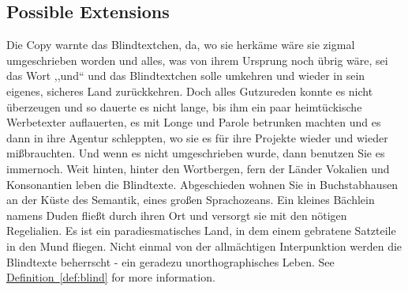 \documentclass[12pt,a4paper,twoside]{scrartcl}
\numberwithin{equation}{section}
\newcommand{\refdef}[1]{\hyperref[#1]{Definition~\ref*{#1}}}
\begin{document}
\subsection{Possible Extensions}

Die Copy warnte das Blindtextchen, da, wo sie herkäme wäre sie zigmal umgeschrieben worden und alles, was von ihrem Ursprung noch übrig wäre, sei das Wort ,,und`` und das Blindtextchen solle umkehren und wieder in sein eigenes, sicheres Land zurückkehren. Doch alles Gutzureden konnte es nicht überzeugen und so dauerte es nicht lange, bis ihm ein paar heimtückische Werbetexter auflauerten, es mit Longe und Parole betrunken machten und es dann in ihre Agentur schleppten, wo sie es für ihre Projekte wieder und wieder mißbrauchten. Und wenn es nicht umgeschrieben wurde, dann benutzen Sie es immernoch. Weit hinten, hinter den Wortbergen, fern der Länder Vokalien und Konsonantien leben die Blindtexte. Abgeschieden wohnen Sie in Buchstabhausen an der Küste des Semantik, eines großen Sprachozeans. Ein kleines Bächlein namens Duden fließt durch ihren Ort und versorgt sie mit den nötigen Regelialien. Es ist ein paradiesmatisches Land, in dem einem gebratene Satzteile in den Mund fliegen. Nicht einmal von der allmächtigen Interpunktion werden die Blindtexte beherrscht - ein geradezu unorthographisches Leben. See \refdef{def:blind} for more information.

\clearpage




\end{document}
